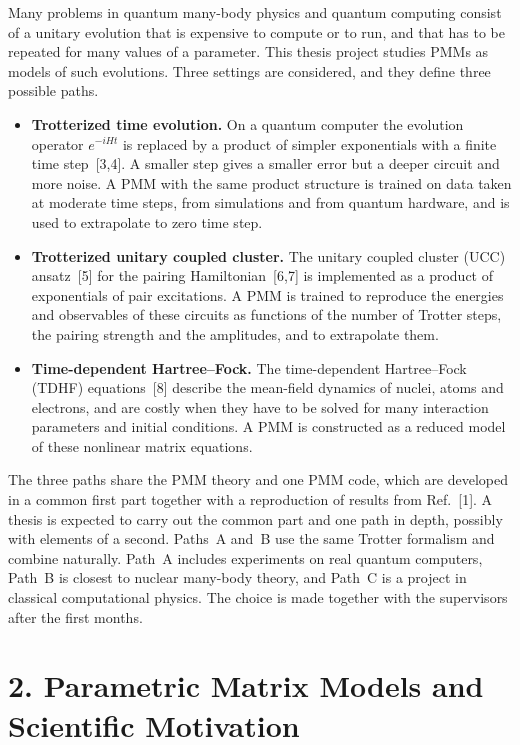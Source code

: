 \documentclass[12pt,a4paper]{article}
\begin{document}
Many problems in quantum many-body physics and quantum computing
consist of a unitary evolution that is expensive to compute or to run,
and that has to be repeated for many values of a parameter.  This
thesis project studies PMMs as models of such evolutions.  Three
settings are considered, and they define three possible paths.
\begin{itemize}
  \item[\textbf{A.}] \textbf{Trotterized time evolution.}  On a
  quantum computer the evolution operator $e^{-iHt}$ is replaced by a
  product of simpler exponentials with a finite time step~[3,4].  A
  smaller step gives a smaller error but a deeper circuit and more
  noise.  A PMM with the same product structure is trained on data
  taken at moderate time steps, from simulations and from quantum
  hardware, and is used to extrapolate to zero time step.
  \item[\textbf{B.}] \textbf{Trotterized unitary coupled cluster.}
  The unitary coupled cluster (UCC) ansatz~[5] for the pairing
  Hamiltonian~[6,7] is implemented as a product of exponentials of
  pair excitations.  A PMM is trained to reproduce the energies and
  observables of these circuits as functions of the number of Trotter
  steps, the pairing strength and the amplitudes, and to extrapolate
  them.
  \item[\textbf{C.}] \textbf{Time-dependent Hartree--Fock.}  The
  time-dependent Hartree--Fock (TDHF) equations~[8] describe the
  mean-field dynamics of nuclei, atoms and electrons, and are costly
  when they have to be solved for many interaction parameters and
  initial conditions.  A PMM is constructed as a reduced model of
  these nonlinear matrix equations.
\end{itemize}
The three paths share the PMM theory and one PMM code, which are
developed in a common first part together with a reproduction of
results from Ref.~[1].  A thesis is expected to carry out the common
part and one path in depth, possibly with elements of a second.
Paths~A and~B use the same Trotter formalism and combine naturally.
Path~A includes experiments on real quantum computers, Path~B is
closest to nuclear many-body theory, and Path~C is a project in
classical computational physics.  The choice is made together with the
supervisors after the first months.

\section*{2. Parametric Matrix Models and Scientific Motivation}
\end{document}
